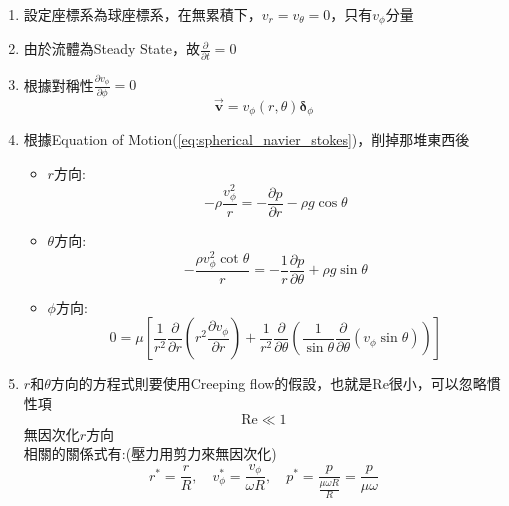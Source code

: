 \documentclass[../main.tex]{subfiles}
\begin{document}
\begin{itemize}
\begin{enumerate}
\begin{enumerate}
      \item 流體連續，無空洞，No-Slip
    \end{enumerate}
    \item 設定座標系為球座標系，在無累積下，$v_r=v_\theta =0$，只有$v_\phi$分量
    \item 由於流體為Steady State，故$\frac{\partial}{\partial t} =0$
    \item 根據對稱性$\frac{\partial v_\phi}{\partial \phi} =0$
    \begin{equation}
      \boxed{\vec{\bm v} = v_\phi (r,\theta) \bm \delta_\phi}
    \end{equation}
    \item  根據Equation of Motion(\ref{eq:spherical_navier_stokes})，削掉那堆東西後
    \begin{itemize}
      \item $r$方向:
      \begin{equation}
        -\rho \frac{v_\phi^2}{r} = -\frac{\partial p}{\partial r} - \rho g \cos\theta
      \end{equation}
      \item $\theta$方向:
      \begin{equation}
        -\frac{\rho v_\phi^2 \cot\theta}{r} = -\frac{1}{r}\frac{\partial p}{\partial \theta} + \rho g \sin\theta
      \end{equation}
      \item $\phi$方向:
      \begin{equation}
        0 = \mu \left[
          \frac{1}{r^2}\frac{\partial}{\partial r}\left(r^2 \frac{\partial v_\phi}{\partial r}\right)
          + \frac{1}{r^2}\frac{\partial}{\partial \theta}
          \left(\frac{1}{\sin\theta}\frac{\partial}{\partial \theta}(v_\phi \sin\theta)\right)
          \right] \label{eq:ch2_3_cone_plate_phi}
      \end{equation}
    \end{itemize}
    \item $r$和$\theta$方向的方程式則要使用Creeping flow的假設，也就是Re很小，可以忽略慣性項
    \begin{equation}
      \text{Re}\ll 1
    \end{equation}
    無因次化$r$方向\\
    相關的關係式有:(壓力用剪力來無因次化)
    \begin{equation}
      r^\ast = \frac{r}{R},\quad v_\phi^\ast = \frac{v_\phi}{\omega R},\quad p^\ast = 
      \frac{p}{\frac{\mu \omega R}{R}} = \frac{p}{\mu \omega}
    \end{equation}

\end{enumerate}
\end{itemize}
\end{document}
